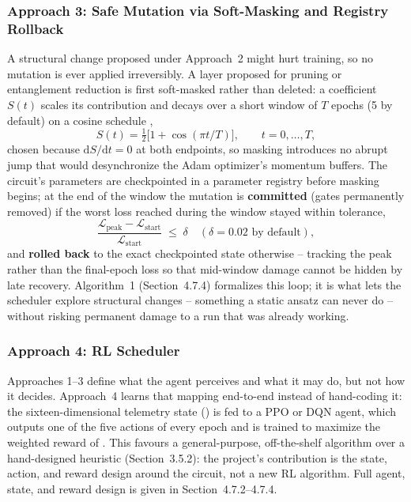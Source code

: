 \subsubsection{Approach 3: Safe Mutation via Soft-Masking and Registry Rollback}
A structural change proposed under Approach~2 might hurt training, so no mutation is ever applied irreversibly. A layer proposed for pruning or entanglement reduction is first soft-masked rather than deleted: a coefficient $S(t)$ scales its contribution and decays over a short window of $T$ epochs (5 by default) on a cosine schedule \citep{loshchilov2017sgdr},
\begin{equation}
S(t) = \tfrac{1}{2}\bigl[1+\cos(\pi t / T)\bigr], \qquad t = 0,\dots,T,
\end{equation}
chosen because $\mathrm{d}S/\mathrm{d}t = 0$ at both endpoints, so masking introduces no abrupt jump that would desynchronize the Adam optimizer's momentum buffers. The circuit's parameters are checkpointed in a parameter registry before masking begins; at the end of the window the mutation is \textbf{committed} (gates permanently removed) if the worst loss reached during the window stayed within tolerance,
\begin{equation}
\frac{\mathcal{L}_{\text{peak}} - \mathcal{L}_{\text{start}}}{\mathcal{L}_{\text{start}}} \;\le\; \delta \quad (\delta = 0.02 \text{ by default}),
\end{equation}
and \textbf{rolled back} to the exact checkpointed state otherwise -- tracking the peak rather than the final-epoch loss so that mid-window damage cannot be hidden by late recovery. Algorithm~1 (Section~4.7.4) formalizes this loop; it is what lets the scheduler explore structural changes -- something a static ansatz can never do -- without risking permanent damage to a run that was already working.

\subsubsection{Approach 4: RL Scheduler}
Approaches 1--3 define what the agent perceives and what it may do, but not how it decides. Approach~4 learns that mapping end-to-end instead of hand-coding it: the sixteen-dimensional telemetry state () is fed to a PPO \citep{schulman2017proximal} or DQN \citep{mnih2015human} agent, which outputs one of the five actions of  every epoch and is trained to maximize the weighted reward of . This favours a general-purpose, off-the-shelf algorithm over a hand-designed heuristic (Section~3.5.2): the project's contribution is the state, action, and reward design around the circuit, not a new RL algorithm. Full agent, state, and reward design is given in Section~4.7.2--4.7.4.

